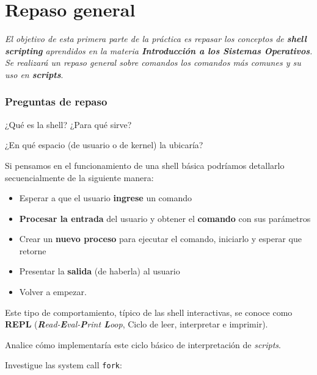 \section{Repaso general}

\textit{El objetivo de esta primera parte de la práctica es repasar los
  conceptos de \textbf{shell scripting} aprendidos en la materia
  \textbf{Introducción a los Sistemas Operativos}. Se realizará un repaso
  general sobre comandos los comandos más comunes y su uso en
  \textbf{scripts}}.

\subsubsection{Preguntas de repaso}

\begin{questions}

\question ¿Qué es la shell? ¿Para qué sirve?

\question ¿En qué espacio (de usuario o de kernel) la ubicaría?

\question Si pensamos en el funcionamiento de una shell básica podríamos
  detallarlo secuencialmente de la siguiente manera:

  \begin{itemize}
    \item Esperar a que el usuario \textbf{ingrese} un comando
    \item \textbf{Procesar la entrada} del usuario y obtener el \textbf{comando} con sus parámetros
    \item Crear un \textbf{nuevo proceso} para ejecutar el comando, iniciarlo y esperar que retorne
    \item Presentar la \textbf{salida} (de haberla) al usuario
    \item Volver a empezar.
  \end{itemize}

  Este tipo de comportamiento, típico de las shell interactivas, se conoce como \textbf{REPL}
  (\textit{\textbf{R}ead-\textbf{E}val-\textbf{P}rint \textbf{L}oop}, Ciclo de leer, interpretar e imprimir).

  Analice cómo implementaría este ciclo básico de interpretación de \textit{scripts}.

\question Investigue las system call \texttt{fork}:
\end{questions}
